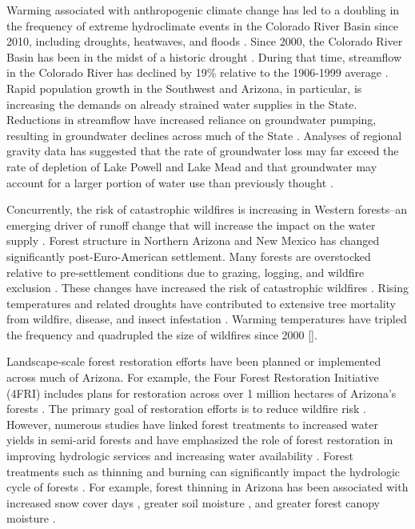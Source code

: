 \documentclass[
  number]{elsarticle}
\begin{document}
Warming associated with anthropogenic climate change has led to a
doubling in the frequency of extreme hydroclimate events in the Colorado
River Basin since 2010, including droughts, heatwaves, and floods
\citep{bennett_concurrent_2021}. Since 2000, the Colorado River Basin
has been in the midst of a historic drought
\citep{meko_treering_2022, williams_rapid_2022}. During that time,
streamflow in the Colorado River has declined by 19\% relative to the
1906-1999 average \citep{hogan_recent_2024, udall_twentyfirst_2017}.
Rapid population growth in the Southwest and Arizona, in particular, is
increasing the demands on already strained water supplies in the State.
Reductions in streamflow have increased reliance on groundwater pumping,
resulting in groundwater declines across much of the State
\citep{tadych_historical_2024}. Analyses of regional gravity data has
suggested that the rate of groundwater loss may far exceed the rate of
depletion of Lake Powell and Lake Mead and that groundwater may account
for a larger portion of water use than previously thought
\citep{castle2014}.

Concurrently, the risk of catastrophic wildfires is increasing in
Western forests--an emerging driver of runoff change that will increase
the impact on the water supply \citep{williams_rapid_2022}. Forest
structure in Northern Arizona and New Mexico has changed significantly
post-Euro-American settlement. Many forests are overstocked relative to
pre-settlement conditions due to grazing, logging, and wildfire
exclusion \citep{covington_southwestern_1994, friederici2013}. These
changes have increased the risk of catastrophic wildfires
\citep{allen_ecological_2002}. Rising temperatures and related droughts
have contributed to extensive tree mortality from wildfire, disease, and
insect infestation \citep{berner_tree_2017}. Warming temperatures have
tripled the frequency and quadrupled the size of wildfires since 2000
{[}\citep{iglesias2022}{]}.

Landscape-scale forest restoration efforts have been planned or
implemented across much of Arizona. For example, the Four Forest
Restoration Initiative (4FRI) includes plans for restoration across over
1 million hectares of Arizona's forests
\citep{schultz_collaborative_2012}. The primary goal of restoration
efforts is to reduce wildfire risk
\citep{allen_ecological_2002, friederici2013}. However, numerous studies
have linked forest treatments to increased water yields in semi-arid
forests and have emphasized the role of forest restoration in improving
hydrologic services and increasing water availability
\citep{bosch_review_1982, baker_effects_1986, gottfried_moderate_1991, smerdon_overview_2009, zou_streamflow_2010, wyatt_estimating_2013, moreno_modeling_2015, simonit_impact_2015, wyatt_semiarid_2015, odonnell_forest_2018, schenk_impacts_2020, hibbert1979}.
Forest treatments such as thinning and burning can significantly impact
the hydrologic cycle of forests \citep{del_campo_global_2022}. For
example, forest thinning in Arizona has been associated with increased
snow cover days
\citep{sankey_multi-scale_2015, belmonte_uav-based_2021, donager_integrating_2021},
greater soil moisture \citep{belmonte_soil_2022, sankey_thinning_2022},
and greater forest canopy moisture \citep{sankey_regionalscale_2021}.
\end{document}
